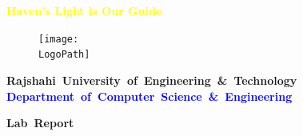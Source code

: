 \documentclass[a4paper,12pt]{report}
\newcommand{\LogoPath}{RUET_logo.png}
\begin{document}
\begin{titlepage}
    \begin{center}

        \textbf{\textcolor{yellow}{\rmfamily Haven's Light is Our Guide}}

        \begin{figure}[h]
            \centering
            \texttt{[image: \\LogoPath]}
        \end{figure}

        \vspace*{0in}
        \Large
        \textbf{\mbox{Rajshahi University of Engineering \& Technology}}
        \large
        \textbf{\mbox{\textcolor{blue}{Department of Computer Science \& Engineering}}}

        \vfill
        \Huge
        \textbf{\mbox{Lab Report}}
        \vfill


\end{center}
\end{titlepage}
\end{document}
